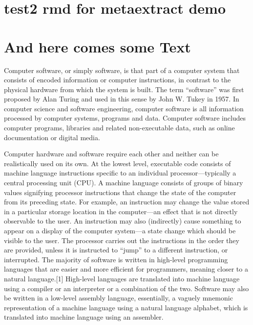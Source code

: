 \documentclass[nojss,shortnames]{jss}
\author{
Ted Tester\\University of Munster \And Carl Connauthora\\N.O.N.E
}
\title{}
\begin{document}
\section{test2 rmd for metaextract
demo}\label{test2-rmd-for-metaextract-demo}

\section{And here comes some Text}\label{and-here-comes-some-text}

Computer software, or simply software, is that part of a computer system
that consists of encoded information or computer instructions, in
contrast to the physical hardware from which the system is built. The
term ``software'' was first proposed by Alan Turing and used in this
sense by John W. Tukey in 1957. In computer science and software
engineering, computer software is all information processed by computer
systems, programs and data. Computer software includes computer
programs, libraries and related non-executable data, such as online
documentation or digital media.

Computer hardware and software require each other and neither can be
realistically used on its own. At the lowest level, executable code
consists of machine language instructions specific to an individual
processor---typically a central processing unit (CPU). A machine
language consists of groups of binary values signifying processor
instructions that change the state of the computer from its preceding
state. For example, an instruction may change the value stored in a
particular storage location in the computer---an effect that is not
directly observable to the user. An instruction may also (indirectly)
cause something to appear on a display of the computer system---a state
change which should be visible to the user. The processor carries out
the instructions in the order they are provided, unless it is instructed
to ``jump'' to a different instruction, or interrupted. The majority of
software is written in high-level programming languages that are easier
and more efficient for programmers, meaning closer to a natural
language.{[}1{]} High-level languages are translated into machine
language using a compiler or an interpreter or a combination of the two.
Software may also be written in a low-level assembly language,
essentially, a vaguely mnemonic representation of a machine language
using a natural language alphabet, which is translated into machine
language using an assembler.
\end{document}

